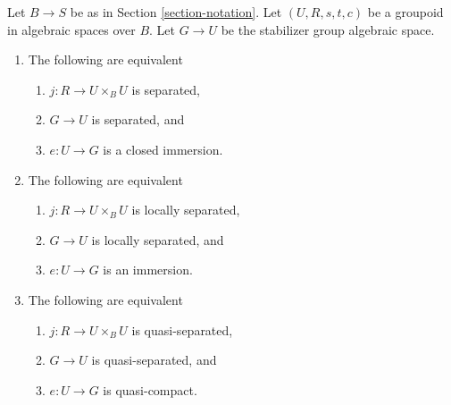 \begin{lemma}
\label{lemma-diagonal}
Let $B \to S$ be as in Section \ref{section-notation}.
Let $(U, R, s, t, c)$ be a groupoid in algebraic spaces over $B$.
Let $G \to U$ be the stabilizer group algebraic space.
\begin{enumerate}
\item The following are equivalent
\begin{enumerate}
\item $j : R \to U \times_B U$ is separated,
\item $G \to U$ is separated, and
\item $e : U \to G$ is a closed immersion.
\end{enumerate}
\item The following are equivalent
\begin{enumerate}
\item $j : R \to U \times_B U$ is locally separated,
\item $G \to U$ is locally separated, and
\item $e : U \to G$ is an immersion.
\end{enumerate}
\item The following are equivalent
\begin{enumerate}
\item $j : R \to U \times_B U$ is quasi-separated,
\item $G \to U$ is quasi-separated, and
\item $e : U \to G$ is quasi-compact.
\end{enumerate}
\end{enumerate}
\end{lemma}

